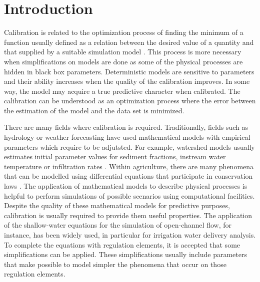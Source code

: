 \documentclass[review,authoryear]{elsarticle}
\begin{document}
\maketitle

\section{Introduction}

Calibration is related to the optimization process of finding the minimum of a
function usually defined as a relation between the desired value of a quantity
and that supplied by a suitable simulation model \citep{WrightNocedal99}. This
process is more necessary when simplifications on models are done as some of the
physical processes are hidden in black box parameters. Deterministic models are
sensitive to parameters and their ability increases when the quality of the
calibration improves. In some way, the model may acquire a true predictive
character when calibrated. The calibration can be understood as an optimization
process where the error between the estimation of the model and the data set is
minimized.

There are many fields where calibration is required. Traditionally, fields such
as hydrology or weather forecasting have used mathematical models with empirical
parameters which require to be adjutsted. For example, watershed models usually
estimates initial parameter values for sediment fractions, instream water
temperature or infiltration rates \citep{Duan04}. Within agriculture, there are
many phenomena that can be modelled using differential equations that
participate in conservation laws
\citep{Playan06,JaviSurcos2,Ebrahimiam13,Ouazaa14,Ouazaa15}. The application of
mathematical models to describe physical processes is helpful to perform
simulations of possible scenarios using computational facilities. Despite the
quality of these mathematical models for predictive purposes, calibration is
usually required to provide them useful properties. The application of the
shallow-water equations for the simulation of open-channel flow, for instance,
has been widely used, in particular for irrigation water delivery analysis. To
complete the equations with regulation elements, it is accepted that some
simplifications can be applied. These simplifications usually include parameters
that make possible to model simpler the phenomena that occur on those regulation
elements.
\end{document}
